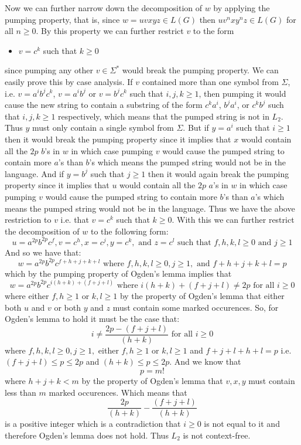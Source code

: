 \documentclass[12pt]{article}
\begin{document}
Now we can further narrow down the decomposition of $w$ by applying the pumping
property, that is, since $w = uvxyz \in L(G)$ then $uv^nxy^nz \in L(G)$ for all
$n \ge 0$. By this property we can further restrict $v$ to the form
\begin{itemize}
\item $v=c^k$ such that $k\ge 0$
\end{itemize}
since pumping any other $v \in \Sigma^*$ would break the pumping property. We
can easily prove this by case analysis. If $v$ contained more than one symbol
from $\Sigma$, i.e. $v=a^ib^jc^k$, $v=a^ib^j$ or $v=b^jc^k$ such that $i,j,k\ge
1$, then pumping it would cause the new string to contain a substring of the
form $c^ka^i$, $b^ja^i$, or $c^kb^j$ such that $i,j,k\ge 1$ respectively,
which means that the pumped string is not in $L_2$. Thus $y$ must only contain
a single symbol from $\Sigma$. But if $y=a^i$ such that $i\ge 1$ then it would
break the pumping property since it implies that $x$ would contain all the $2p$
$b$'s in $w$ in which case pumping $v$ would cause the pumped string to contain
more $a$'s than $b$'s which means the pumped string would not be in the language.
And if $y=b^j$ such that $j\ge 1$ then it would again break the pumping property
since it implies that $u$ would contain all the $2p$ $a$'s in $w$ in which case
pumping $v$ would cause the pumped string to contain more $b$'s than $a$'s which
means the pumped string would not be in the language. Thus we have the above
restriction to $v$ i.e. that $v=c^k$ such that $k\ge 0$. With this we can
further restrict the decomposition of $w$ to the following form:
$$u=a^{2p}b^{2p}c^f, v=c^h, x=c^j, y=c^k,\text{ and } z=c^l
\text{ such that } f,h,k,l\ge 0 \text{ and } j\ge1$$
And so we have that:
$$w = a^{2p}b^{2p}c^{f+h+j+k+l} \text{ where } f,h,k,l\ge 0, j\ge 1,
\text{ and } f+h+j+k+l=p$$
which by the pumping property of Ogden's lemma implies that
$$w = a^{2p}b^{2p}c^{i(h+k) + (f+j+l)} \text { where } i(h+k)+(f+j+l)\neq 2p
\text{ for all } i\ge 0$$
where either $f,h\ge 1$ or $k,l\ge 1$ by the property of Ogden's lemma that
either both $u$ and $v$ or both $y$ and $z$ must contain some marked occurences.
So, for Ogden's lemma to hold it must be the case that:
$$i \neq \frac{2p-(f+j+l)}{(h+k)} \text{ for all } i\ge 0$$
where $f,h,k,l \ge 0, j\ge 1,$ either $f,h\ge 1$ or $k,l\ge 1$ and
$f+j+l+h+l = p$ i.e. $(f+j+l) \le p \le 2p$ and $(h+k) \le p \le 2p$. And we
know that
$$p = m!$$
where $h+j+k < m$ by the property of Ogden's lemma that $v,x,y$ must contain
less than $m$ marked occurences. Which means that
$$\frac{2p}{(h+k)}-\frac{(f+j+l)}{(h+k)}$$
is a positive integer which is a contradiction that $i\ge 0$ is not equal to
it and therefore Ogden's lemma does not hold. Thus $L_2$ is not context-free.
\end{document}
